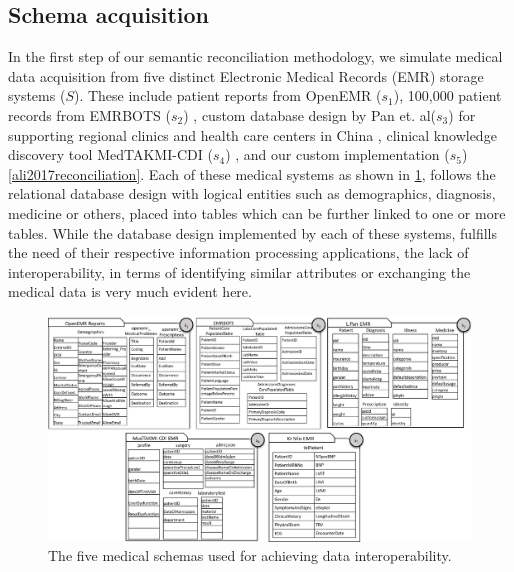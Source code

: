 \documentclass{ieeeaccess}
\begin{document}
\subsection{Schema acquisition}
\label{schema_acq}
In the first step of our semantic reconciliation methodology, we simulate medical data acquisition from five distinct Electronic Medical Records (EMR) storage systems ($S$). These include patient reports from OpenEMR ($s_1$), 100,000 patient records from EMRBOTS ($s_2$) \cite{kartoun2016methodology}, custom database design by Pan et. al($s_3$) for supporting regional clinics and health care centers in China \cite{pan2016design}, clinical knowledge discovery tool MedTAKMI-CDI ($s_4$) \cite{inokuchi2007medtakmi}, and our custom implementation ($s_5$) \ref{ali2017reconciliation}. Each of these medical systems as shown in \ref{fig:schema}, follows the relational database design with logical entities such as demographics, diagnosis, medicine or others, placed into tables which can be further linked to one or more tables. While the database design implemented by each of these systems, fulfills the need of their respective information processing applications, the lack of interoperability, in terms of identifying similar attributes or exchanging the medical data is very much evident here. 


\begin{figure}[t!]
	\centering
	\includegraphics[scale=0.53]{schemas}
	\caption{The five medical schemas used for achieving data interoperability.}
	\label{fig:schema}
\end{figure} 
\end{document}
